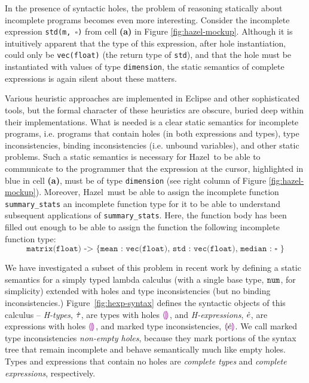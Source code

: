 \documentclass[letterpaper,USenglish]{lipics-v2016}
\let\li\lstinline
\newcommand{\Hazel}[0]{\textsf{Hazel}}
\newcommand{\HazelEnv}[0]{\Hazel}
\begin{document}
In the presence of syntactic holes, the problem of reasoning statically about incomplete programs 
becomes even more interesting.  Consider the incomplete expression \texttt{std(m,~$\square$)} 
from cell \textbf{(a)} in Figure \ref{fig:hazel-mockup}.
%
%
Although it is intuitively apparent that the type of this expression, after hole instantiation, could only be \lstinline{vec(float)} (the return type of \lstinline{std}),
and that the hole must be instantiated with values of type \li{dimension}, the static
semantics of complete expressions is again silent about these matters. 

Various heuristic
approaches are implemented in Eclipse and other sophisticated tools, but the 
formal character of these heuristics are obscure, buried deep within their implementations. What is needed is a clear static semantics for incomplete programs, i.e. programs that contain holes (in both expressions and types), type inconsistencies, binding inconsistencies (i.e. unbound variables), and
other static problems. Such a static semantics is necessary for \HazelEnv~to be able to  
communicate to the programmer that the expression at the cursor, highlighted in blue in cell \textbf{(a)}, must be of type \li{dimension} (see right column of Figure \ref{fig:hazel-mockup}). Moreover, \HazelEnv~must be able to assign the incomplete function
\li{summary_stats} an incomplete function
type for it to be able to understand subsequent applications of \li{summary_stats}. Here, the function body has been filled out enough to be able to assign the function the following incomplete function type:
\[\texttt{matrix(float) -> \{ {mean} : vec(float), std : vec(float), median :~$\square$ \}}\] %

We have investigated a subset of this problem in recent work \cite{popl-paper} by defining a static
semantics for a simply typed lambda calculus (with a 
single base type, $\texttt{num}$, for simplicity) extended with holes and type
inconsistencies (but no binding inconsistencies.) Figure~\ref{fig:hexp-syntax} defines the syntactic
objects of this calculus -- \emph{H-types}, $\dot{\tau}$,
are types with holes $\textcolor{violet}{\llparenthesis}\textcolor{violet}{\rrparenthesis}$, and \emph{H-expressions}, $\dot{e}$, are
expressions with holes $\textcolor{violet}{\llparenthesis}\textcolor{violet}{\rrparenthesis}$, and marked type inconsistencies,
$\textcolor{violet}{\llparenthesis}\dot{e}\textcolor{violet}{\rrparenthesis}$. We call marked type inconsistencies \emph{non-empty holes},
because they mark portions of the syntax tree that remain
incomplete and behave semantically much like empty holes. Types and expressions that contain no holes are \emph{complete
  types} and \emph{complete expressions}, respectively.
\end{document}

